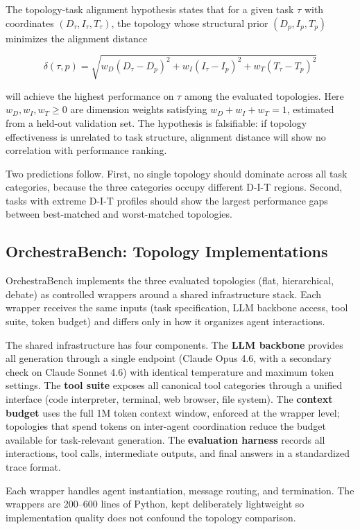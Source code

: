 The topology-task alignment hypothesis states that for a given task $\tau$ with coordinates $(D_\tau, I_\tau, T_\tau)$, the topology whose structural prior $(D_p, I_p, T_p)$ minimizes the alignment distance

$$\delta(\tau, p) = \sqrt{w_D(D_\tau - D_p)^2 + w_I(I_\tau - I_p)^2 + w_T(T_\tau - T_p)^2}$$

will achieve the highest performance on $\tau$ among the evaluated topologies. Here $w_D, w_I, w_T \geq 0$ are dimension weights satisfying $w_D + w_I + w_T = 1$, estimated from a held-out validation set. The hypothesis is falsifiable: if topology effectiveness is unrelated to task structure, alignment distance will show no correlation with performance ranking.

Two predictions follow. First, no single topology should dominate across all task categories, because the three categories occupy different D-I-T regions. Second, tasks with extreme D-I-T profiles should show the largest performance gaps between best-matched and worst-matched topologies.

\subsection{OrchestraBench: Topology Implementations}\label{orchestrabench-topology-implementations}

OrchestraBench implements the three evaluated topologies (flat, hierarchical, debate) as controlled wrappers around a shared infrastructure stack. Each wrapper receives the same inputs (task specification, LLM backbone access, tool suite, token budget) and differs only in how it organizes agent interactions.

The shared infrastructure has four components. The \textbf{LLM backbone} provides all generation through a single endpoint (Claude Opus 4.6, with a secondary check on Claude Sonnet 4.6) with identical temperature and maximum token settings. The \textbf{tool suite} exposes all canonical tool categories through a unified interface (code interpreter, terminal, web browser, file system). The \textbf{context budget} uses the full 1M token context window, enforced at the wrapper level; topologies that spend tokens on inter-agent coordination reduce the budget available for task-relevant generation. The \textbf{evaluation harness} records all interactions, tool calls, intermediate outputs, and final answers in a standardized trace format.

Each wrapper handles agent instantiation, message routing, and termination. The wrappers are 200--600 lines of Python, kept deliberately lightweight so implementation quality does not confound the topology comparison.

